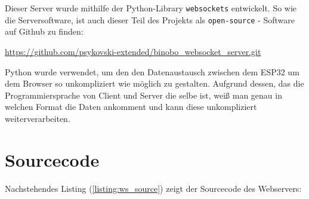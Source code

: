 \documentclass[paper=a4,12pt]{scrreprt}
\begin{document}
Dieser Server wurde mithilfe der Python-Library \texttt{websockets}\cite{websockets_library} entwickelt.\newline
So wie die Serversoftware, ist auch dieser Teil des Projekts als \texttt{open-source} - Software auf Github zu finden:\newline

\url{https://github.com/psykovski-extended/binobo_websocket_server.git}\newline

Python wurde verwendet, um den den Datenaustausch zwischen dem ESP32 um dem Browser so unkompliziert wie möglich zu gestalten. Aufgrund dessen, das die Programmiersprache von Client und Server die selbe ist,
weiß man genau in welchen Format die Daten ankomment und kann diese unkompliziert weiterverarbeiten.\newline

\section{Sourcecode}

Nachstehendes Listing (\ref{listing:ws_source}) zeigt der Sourcecode des Webservers:\newline
\end{document}
